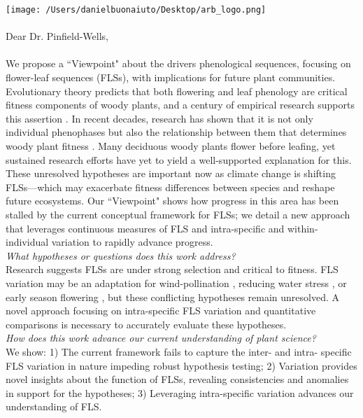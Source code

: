 \documentclass[11pt,a4paper]{article}
\begin{document}

\def\labelitemi{--}
\parindent=24pt
\texttt{[image: /Users/danielbuonaiuto/Desktop/arb\_logo.png]}
\\\\
{Dear Dr. Pinfield-Wells,}\\
\vspace{1.5ex}\\
\noindent We propose a ``Viewpoint" about the drivers phenological sequences, focusing on flower-leaf sequences (FLSs), with implications for future plant communities. Evolutionary theory predicts that both flowering and leaf phenology are critical fitness components of woody plants, and a century of empirical research supports this assertion \citep{Munguia-Rosas2011,Forrest2010}. In recent decades, research has shown that it is not only individual phenophases but also the relationship between them that determines woody plant fitness \citep{Menzel1999,Ettinger2018}. Many deciduous woody plants flower before leafing, yet sustained research efforts have yet to yield a well-supported explanation for this. These unresolved hypotheses are important now as climate change is shifting FLSs---which may exacerbate fitness differences between species and reshape future ecosystems. Our ``Viewpoint" shows how progress in this area has been stalled by the current conceptual framework for FLSs; we detail a new approach that leverages continuous measures of FLS and intra-specific and within-individual variation to rapidly advance progress.\\

\noindent \emph{What hypotheses or questions does this work address?}\\
\noindent Research suggests FLSs are under strong selection and critical to fitness. FLS variation may be an adaptation for wind-pollination \citep{Rathcke_1985}, reducing water stress \citep{Reich1984}, or early season flowering \citep{Primack1987}, but these conflicting hypotheses remain unresolved. A novel approach focusing on intra-specific FLS variation and quantitative comparisons is necessary to accurately evaluate these hypotheses.\\

\noindent \emph{How does this work advance our current understanding of plant science?}\\

\noindent We show: 1) The current framework fails to capture the inter- and intra- specific FLS variation in nature impeding robust hypothesis testing; 2) Variation provides novel insights about the function of FLSs, revealing consistencies and anomalies in support for the hypotheses; 3) Leveraging intra-specific variation advances our understanding of FLS.\\ %
\end{document}
